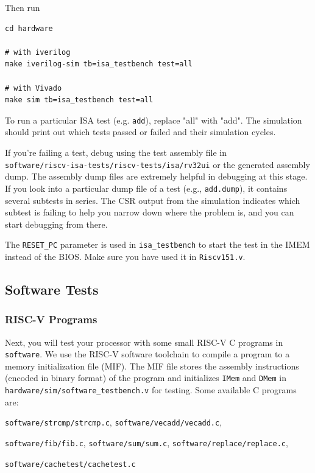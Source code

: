 \documentclass[11pt]{article}
\begin{document}
Then run

\begin{verbatim}
cd hardware

# with iverilog
make iverilog-sim tb=isa_testbench test=all

# with Vivado
make sim tb=isa_testbench test=all
\end{verbatim}

To run a particular ISA test (e.g. \verb|add|), replace "all" with "add". The simulation should print out which tests passed or failed and their simulation cycles.

If you're failing a test, debug using the test assembly file in\\\verb|software/riscv-isa-tests/riscv-tests/isa/rv32ui| or the generated assembly dump.
The assembly dump files are extremely helpful in debugging at this stage. If you look into a particular dump file of a test (e.g., \verb|add.dump|), it contains several subtests in series. The CSR output from the simulation indicates which subtest is failing to help you narrow down where the problem is, and you can start debugging from there.

The \verb|RESET_PC| parameter is used in \verb|isa_testbench| to start the test in the IMEM instead of the BIOS.
Make sure you have used it in \verb|Riscv151.v|.

\subsection{Software Tests}

\subsubsection{RISC-V Programs}

Next, you will test your processor with some small RISC-V C programs in \verb|software|.
We use the RISC-V software toolchain to compile a program to a memory initialization file
(MIF). The MIF file stores the assembly instructions (encoded in binary format)
of the program and initializes \texttt{IMem} and \texttt{DMem} in
\verb|hardware/sim/software_testbench.v| for testing.
Some available C programs are:

\verb|software/strcmp/strcmp.c|, \verb|software/vecadd/vecadd.c|,

\verb|software/fib/fib.c|, \verb|software/sum/sum.c|, \verb|software/replace/replace.c|,

\verb|software/cachetest/cachetest.c|
\end{document}
